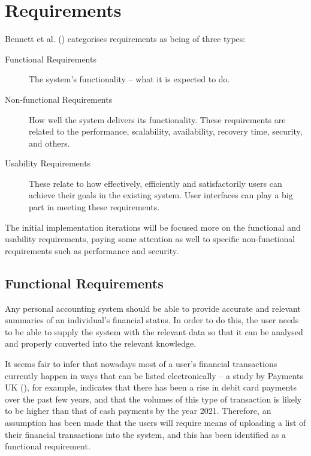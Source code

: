 \section{Requirements} \label{sec:Requirements}

Bennett et al. (\citeyear[][pp.~140-142]{bennett2010object}) categorises
requirements as being of three types:

\begin{description} \item[Functional Requirements]
    The system's functionality -- what it is expected to do.
    
  \item[Non-functional Requirements]
    How well the system delivers its functionality. These requirements are
    related to the performance, scalability, availability, recovery time,
    security, and others.

  \item[Usability Requirements]
    These relate to how effectively, efficiently and satisfactorily users can
    achieve their goals in the existing system. User interfaces can play a big
    part in meeting these requirements.
\end{description}

The initial implementation iterations will be focused more on the functional
and usability requirements, paying some attention as well to specific
non-functional requirements such as performance and security.


\subsection{Functional Requirements} \label{sec:Requirements.FunctionalRequirements}

Any personal accounting system should be able to provide accurate and relevant
summaries of an individual's financial status. In order to do this, the user
needs to be able to supply the system with the relevant data so that it can be
analysed and properly converted into the relevant knowledge.

It seems fair to infer that nowadays most of a user's financial transactions
currently happen in ways that can be listed electronically -- a study by
Payments UK (\citeyear{paymentsUK2017summary}), for example, indicates that
there has been a rise in debit card payments over the past few years, and that
the volumes of this type of transaction is likely to be higher than that of
cash payments by the year 2021. Therefore, an assumption has been made that the
users will require means of uploading a list of their financial transactions
into the system, and this has been identified as a functional requirement.

